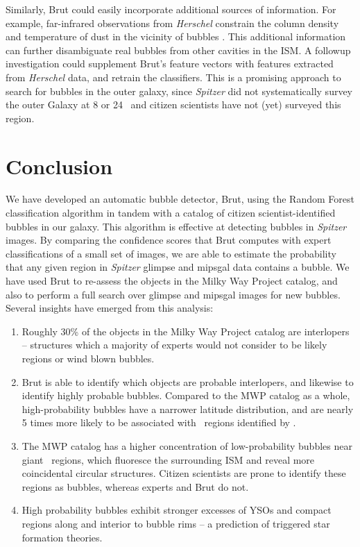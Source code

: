Similarly, Brut could easily incorporate additional sources of information. For example, far-infrared observations from \emph{Herschel} constrain the column density and temperature of dust in the vicinity of bubbles \citep{Anderson12}. This additional information can further disambiguate real bubbles from other cavities in the ISM. A followup investigation could supplement Brut's feature vectors with features extracted from \emph{Herschel} data, and retrain the classifiers. This is a promising approach to search for bubbles in the outer galaxy, since \emph{Spitzer} did not systematically survey the outer Galaxy at 8 or 24 \um\, and citizen scientists have not (yet) surveyed this region.


\section{Conclusion}
\label{sec:conclusion_ch6_brut}
We have developed an automatic bubble detector, Brut, using the Random Forest classification algorithm in tandem with a catalog of citizen scientist-identified bubbles in our galaxy. This algorithm is effective at detecting bubbles in \emph{Spitzer} images. By comparing the confidence scores that Brut computes with expert classifications of a small set of images, we are able to estimate the probability that any given region in \emph{Spitzer} {\sc glimpse} and {\sc mipsgal} data contains a bubble. We have used Brut to re-assess the objects in the Milky Way Project catalog, and also to perform a full search over {\sc glimpse} and {\sc mipsgal} images for new bubbles.  Several insights have emerged from this analysis:
\begin{enumerate}
\item Roughly 30\% of the objects in the Milky Way Project catalog are interlopers -- structures which a majority of experts would not consider to be likely \hii\, regions or wind blown bubbles.
\item Brut is able to identify which objects are probable interlopers, and likewise to identify highly probable bubbles. Compared to the MWP catalog as a whole, high-probability bubbles have a narrower latitude distribution, and are nearly 5 times more likely to be associated with \hii\, regions identified by \cite{Anderson11}.
\item The MWP catalog has a higher concentration of low-probability bubbles near giant \hii\, regions, which fluoresce the surrounding ISM and reveal more coincidental circular structures. Citizen scientists are prone to identify these regions as bubbles, whereas experts and Brut do not.
\item High probability bubbles  exhibit stronger excesses of YSOs and compact \hii\, regions along and interior to bubble rims -- a prediction of triggered star formation theories.
\end{enumerate}

